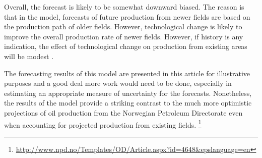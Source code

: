 \documentclass[12pt]{scrartcl} %
\begin{document}
Overall, the forecast is likely to be somewhat downward biased.  The reason is that in the model, forecasts of future production from newer fields are based on the production path of older fields.  However, technological change is likely to improve the overall production rate of newer fields.  However, if history is any indication, the effect of technological change on production from existing areas will be modest \citep{hamilton_oil_2012}.

The forecasting results of this model are presented in this article for illustrative purposes and a good deal more work would need to be done, especially in estimating an appropriate measure of uncertainty for the forecasts.  Nonetheless, the results of the model provide a striking contrast to the much more optimistic projections of oil production from the Norwegian Petroleum Directorate even when accounting for projected production from existing fields. \footnote{\url{http://www.npd.no/Templates/OD/Article.aspx?id=4648&epslanguage=en}}




\end{document}
